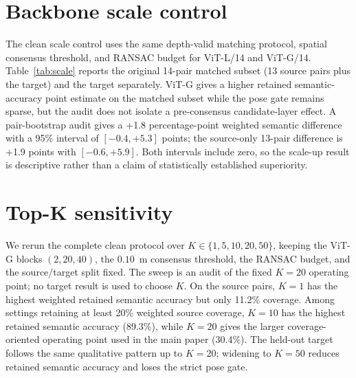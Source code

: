\documentclass[10pt,twocolumn]{article}
\begin{document}
\begin{table}[t]
\centering
\scriptsize
\resizebox{\columnwidth}{!}{}
\caption{Post-hoc candidate-set availability audit at $K=20$. ``Recovery'' is
the fraction of queries with a correct semantic candidate that become correct
semantic inliers. Miss inliers are geometric inliers with no correct semantic
candidate in their top-20 set.}
\label{tab:candidate-audit}
\end{table}

\section{Backbone scale control}

The clean scale control uses the same depth-valid matching protocol, spatial
consensus threshold, and RANSAC budget for ViT-L/14 and ViT-G/14. Table~\ref{tab:scale}
reports the original 14-pair matched subset (13 source pairs plus the target)
and the target separately. ViT-G gives a higher retained semantic-accuracy
point estimate on the matched subset while the pose gate remains sparse, but
the audit does not isolate a pre-consensus candidate-layer effect. A
pair-bootstrap audit gives
a +1.8 percentage-point weighted semantic difference with a 95\% interval of
$[-0.4,+5.3]$ points; the source-only 13-pair difference is +1.9 points with
$[-0.6,+5.9]$. Both intervals include zero, so the scale-up result is
descriptive rather than a claim of statistically established superiority.

\begin{table}[t]
\centering
\scriptsize
\resizebox{\columnwidth}{!}{}
\caption{Clean ViT-L/14 to ViT-G/14 scale control.}
\label{tab:scale}
\end{table}

\section{Top-K sensitivity}

We rerun the complete clean protocol over $K\in\{1,5,10,20,50\}$, keeping
the ViT-G blocks $(2,20,40)$, the $0.10$~m consensus threshold, the RANSAC
budget, and the source/target split fixed. The sweep is an audit of the fixed
$K=20$ operating point; no target result is used to choose $K$. On the source
pairs, $K=1$ has the highest weighted retained semantic accuracy but only 11.2\%
coverage. Among settings retaining at least 20\% weighted source coverage,
$K=10$ has the highest retained semantic accuracy (89.3\%), while $K=20$ gives the larger
coverage-oriented operating point used in the main paper (30.4\%). The
held-out target follows the same qualitative pattern up to $K=20$; widening
to $K=50$ reduces retained semantic accuracy and loses the strict pose gate.
\end{document}
